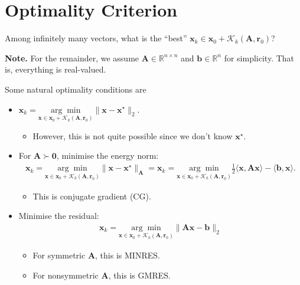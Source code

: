 \documentclass[12pt,a4paper]{article} %
\begin{document}
\section{Optimality Criterion}
Among infinitely many vectors, 
what is the ``best'' $\bm x_k \in \bm x_0 + \mathcal K_k(\mathbf A, \bm r_0)$?

\textbf{Note.} For the remainder, we assume $\mathbf A \in \mathbb R^{n \times n}$
and $\bm b \in \mathbb R^n$ for simplicity. That is, everything is real-valued.

Some natural optimality conditions are 
\iffalse
\bm x_k = \underset{\bm x \in \bm x_0 + \mathcal K_k(\mathbf A, \bm r_0)}{\arg \min }
\fi
\begin{itemize}    
    \item $\bm x_k = \underset{\bm x \in \bm x_0 + \mathcal K_k(\mathbf A, \bm r_0)}{\arg \min } \| \bm x - \bm x^\star \|_2$.
    \begin{itemize}
        \item However, this is not quite possible since we don't know $\bm x^\star$.
    \end{itemize}
    \item For $\mathbf A \succ \mathbf 0$, minimise the energy norm:
    \begin{align*}
        \bm x_k = \underset{\bm x \in \bm x_0 + \mathcal K_k(\mathbf A, \bm r_0)}{\arg \min } \|\bm x - \bm x^\star\|_\mathbf A = \bm x_k = \underset{\bm x \in \bm x_0 + \mathcal K_k(\mathbf A, \bm r_0)}{\arg \min } \frac{1}{2} \langle \bm x, \mathbf A \bm x \rangle - \langle \bm b, \bm x \rangle.
    \end{align*}
    \begin{itemize}
        \item This is conjugate gradient (CG).
    \end{itemize}
    \item Minimise the residual:
    \begin{align*}
        \bm x_k = \underset{\bm x \in \bm x_0 + \mathcal K_k(\mathbf A, \bm r_0)}{\arg \min } \| \mathbf A \bm x - \bm b \|_2
    \end{align*}
    \begin{itemize}
        \item For symmetric $\mathbf A$, this is MINRES.
        \item For nonsymmetric $\mathbf A$, this is GMRES.
    \end{itemize}
\end{itemize}
\end{document}
